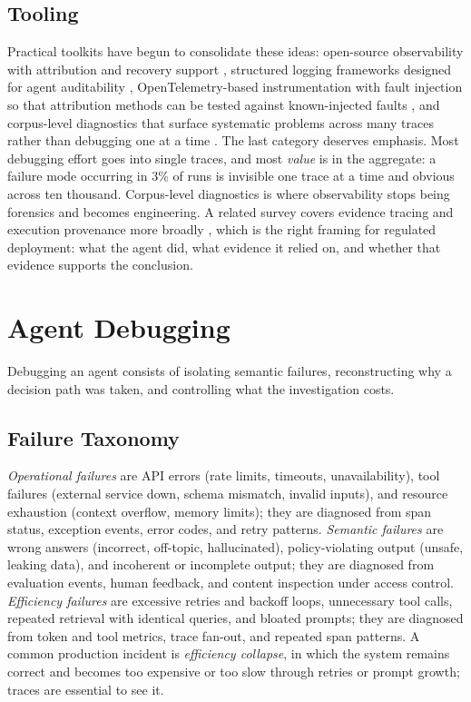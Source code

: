 \documentclass[11pt]{book}
\begin{document}
\subsection{Tooling}

Practical toolkits have begun to consolidate these ideas: open-source observability with attribution and recovery support \cite{agentdebugx2026}, structured logging frameworks designed for agent auditability \cite{agenttrace2026}, OpenTelemetry-based instrumentation with fault injection so that attribution methods can be tested against known-injected faults \cite{otelmas2026}, and corpus-level diagnostics that surface systematic problems across many traces rather than debugging one at a time \cite{insights2026}. The last category deserves emphasis. Most debugging effort goes into single traces, and most \textit{value} is in the aggregate: a failure mode occurring in 3\% of runs is invisible one trace at a time and obvious across ten thousand. Corpus-level diagnostics is where observability stops being forensics and becomes engineering. A related survey covers evidence tracing and execution provenance more broadly \cite{provenance2026}, which is the right framing for regulated deployment: what the agent did, what evidence it relied on, and whether that evidence supports the conclusion.

\section{Agent Debugging}

Debugging an agent consists of isolating semantic failures, reconstructing why a decision path was taken, and controlling what the investigation costs.

\subsection{Failure Taxonomy}

\textit{Operational failures} are API errors (rate limits, timeouts, unavailability), tool failures (external service down, schema mismatch, invalid inputs), and resource exhaustion (context overflow, memory limits); they are diagnosed from span status, exception events, error codes, and retry patterns. \textit{Semantic failures} are wrong answers (incorrect, off-topic, hallucinated), policy-violating output (unsafe, leaking data), and incoherent or incomplete output; they are diagnosed from evaluation events, human feedback, and content inspection under access control. \textit{Efficiency failures} are excessive retries and backoff loops, unnecessary tool calls, repeated retrieval with identical queries, and bloated prompts; they are diagnosed from token and tool metrics, trace fan-out, and repeated span patterns. A common production incident is \textit{efficiency collapse}, in which the system remains correct and becomes too expensive or too slow through retries or prompt growth; traces are essential to see it.
\end{document}
